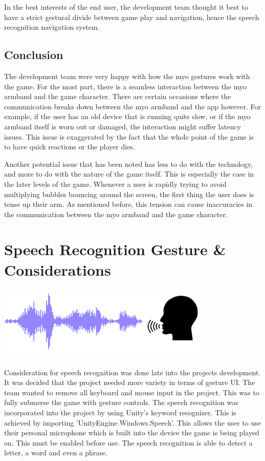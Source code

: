\documentclass{article}
\begin{document}
\bigskip

In the best interests of the end user, the development team thought it best to have a strict gestural divide between game play and navigation, hence the speech recognition navigation system.



\subsection{Conclusion}
The development team were very happy with how the myo gestures work with the game. For the most part, there is a seamless interaction between the myo armband and the game character. There are certain occasions where the communication breaks down between the myo armband and the app however. For example, if the user has an old device that is running quite slow, or if the myo armband itself is worn out or damaged, the interaction might suffer latency issues. This issue is exaggerated by the fact that the whole point of the game is to have quick reactions or the player dies. 

Another potential issue that has been noted has less to do with the technology, and more to do with the nature of the game itself. This is especially the case in the later levels of the game. Whenever a user is rapidly trying to avoid multiplying bubbles bouncing around the screen, the first thing the user does is tense up their arm. As mentioned before, this tension can cause inaccuracies in the communication between the myo armband and the game character. 

\section{Speech Recognition Gesture \& Considerations}
\includegraphics[width=\textwidth, height=100pt]{img/speechrecognition.png}
\bigskip

Consideration for speech recognition was done late into the projects development. It was decided that the project needed more variety in terms of gesture UI. The team wanted to remove all keyboard and mouse input in the project. This was to fully submerse the game with gesture controls.
The speech recognition was incorporated into the project by using Unity's keyword recognizer. This is achieved by importing 'UnityEngine.Windows.Speech'. This allows the user to use their personal microphone which is built into the device the game is being played on. This must be enabled before use. The speech recognition is able to detect a letter, a word and even a phrase.
\end{document}
